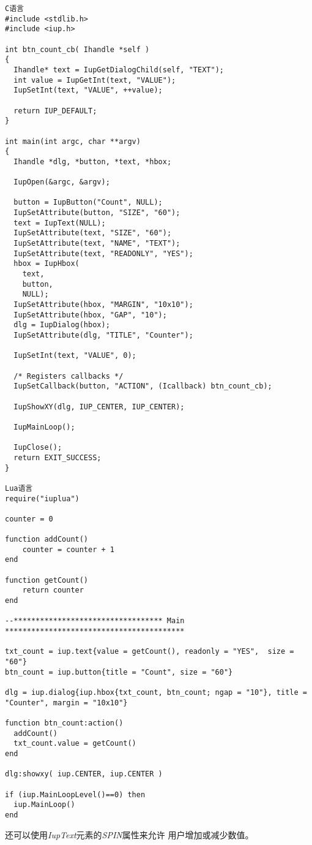 \documentclass{ctexart}
\begin{document}
\lstset{language=C}
\begin{lstlisting}
C语言
#include <stdlib.h>
#include <iup.h>

int btn_count_cb( Ihandle *self )
{
  Ihandle* text = IupGetDialogChild(self, "TEXT");
  int value = IupGetInt(text, "VALUE");
  IupSetInt(text, "VALUE", ++value);

  return IUP_DEFAULT;
}

int main(int argc, char **argv)
{
  Ihandle *dlg, *button, *text, *hbox;

  IupOpen(&argc, &argv);
  
  button = IupButton("Count", NULL);
  IupSetAttribute(button, "SIZE", "60");
  text = IupText(NULL);
  IupSetAttribute(text, "SIZE", "60");
  IupSetAttribute(text, "NAME", "TEXT");
  IupSetAttribute(text, "READONLY", "YES");
  hbox = IupHbox(
    text,
    button,
    NULL);
  IupSetAttribute(hbox, "MARGIN", "10x10");
  IupSetAttribute(hbox, "GAP", "10");
  dlg = IupDialog(hbox);
  IupSetAttribute(dlg, "TITLE", "Counter");

  IupSetInt(text, "VALUE", 0);

  /* Registers callbacks */
  IupSetCallback(button, "ACTION", (Icallback) btn_count_cb);

  IupShowXY(dlg, IUP_CENTER, IUP_CENTER);

  IupMainLoop();

  IupClose();
  return EXIT_SUCCESS;
}

Lua语言
require("iuplua")

counter = 0

function addCount()
	counter = counter + 1
end

function getCount()
	return counter
end

--********************************** Main *****************************************

txt_count = iup.text{value = getCount(), readonly = "YES",  size = "60"}
btn_count = iup.button{title = "Count", size = "60"}

dlg = iup.dialog{iup.hbox{txt_count, btn_count; ngap = "10"}, title = "Counter", margin = "10x10"}

function btn_count:action()
  addCount()
  txt_count.value = getCount()
end

dlg:showxy( iup.CENTER, iup.CENTER )

if (iup.MainLoopLevel()==0) then
  iup.MainLoop()
end
\end{lstlisting}

还可以使用\emph{IupText}元素的\emph{SPIN}属性来允许
用户增加或减少数值。
\end{document}
